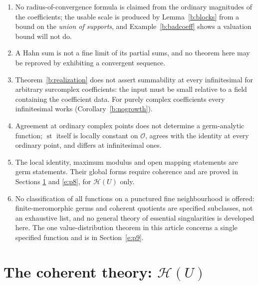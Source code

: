 \documentclass[11pt,a4paper]{article}
\numberwithin{equation}{section}
\theoremstyle{definition}
\theoremstyle{remark}
\theoremstyle{plain}
\newcommand{\Ov}{\mathcal O}
\DeclareMathOperator{\st}{st}
\newcommand{\Hc}{\mathcal H}
\begin{document}
\begin{enumerate}[label=\textup{(\arabic*)},leftmargin=2.4em]
\item No radius-of-convergence formula is claimed from the ordinary
magnitudes of the coefficients; the usable scale is produced by
Lemma~\ref{b:blocks} from a bound on the \emph{union of supports}, and
Example~\ref{b:badcoeff} shows a valuation bound will not do.
\item A Hahn sum is not a fine limit of its partial sums, and no theorem
here may be reproved by exhibiting a convergent sequence.
\item Theorem~\ref{b:realization} does not assert summability at every
infinitesimal for arbitrary surcomplex coefficients: the input must be
small relative to a field containing the coefficient data. For purely
complex coefficients every infinitesimal works
(Corollary~\ref{b:nogrowth}).
\item Agreement at ordinary complex points does not determine a
germ-analytic function; $\st$ itself is locally constant on $\Ov$, agrees
with the identity at every ordinary point, and differs at infinitesimal
ones.
\item The local identity, maximum modulus and open mapping statements are
germ statements. Their global forms require coherence and are proved in
Sections \ref{c:p4} and \ref{e:p8}, for $\Hc(U)$ only.
\item No classification of all functions on a punctured fine neighbourhood
is offered: finite-meromorphic germs and coherent quotients are specified
subclasses, not an exhaustive list, and no general theory of essential
singularities is developed here. The one value-distribution theorem in
this article concerns a single specified function and is in Section~\ref{e:p9}.
\end{enumerate}



\section{The coherent theory: \texorpdfstring{$\Hc(U)$}{H(U)}}
\label{c:p4}
\end{document}
